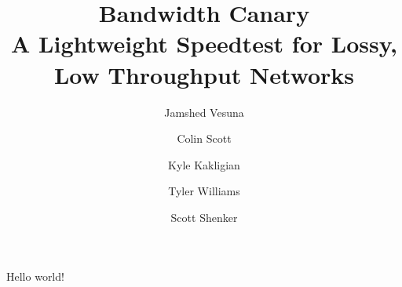 \documentclass{llncs}
\title{Bandwidth Canary \\
A Lightweight Speedtest for Lossy, Low Throughput Networks
}
\author{Jamshed Vesuna\inst{1} \and Colin Scott\inst{1} \and Kyle Kakligian\inst{2}
\and Tyler Williams\inst{2} \and Scott Shenker\inst{1}}
\institute{UC Berkeley, Berkeley, CA \and Google}
\begin{document}
   \date{}
   \maketitle
   \thispagestyle{empty}

Hello world!

%

%
%
%
%
%


%

\end{document}
